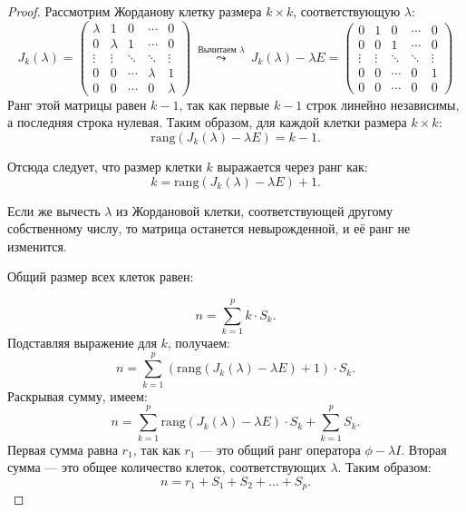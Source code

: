 \begin{proof}
    Рассмотрим Жорданову клетку размера \( k \times k \), соответствующую \( \lambda \):
    \[
    J_k(\lambda) = \begin{pmatrix}
    \lambda & 1 & 0 & \cdots & 0 \\
    0 & \lambda & 1 & \cdots & 0 \\
    \vdots & \vdots & \ddots & \ddots & \vdots \\
    0 & 0 & \cdots & \lambda & 1 \\
    0 & 0 & \cdots & 0 & \lambda
    \end{pmatrix}
    \ \overset{\text{Вычитаем } \lambda}{\leadsto} \ 
    J_k(\lambda) - \lambda E = \begin{pmatrix}
    0 & 1 & 0 & \cdots & 0 \\
    0 & 0 & 1 & \cdots & 0 \\
    \vdots & \vdots & \ddots & \ddots & \vdots \\
    0 & 0 & \cdots & 0 & 1 \\
    0 & 0 & \cdots & 0 & 0
    \end{pmatrix}
    \]
    Ранг этой матрицы равен \( k - 1 \), так как первые \( k - 1 \) строк линейно независимы, а последняя строка нулевая. Таким образом, для каждой клетки размера \( k \times k \):
    \[
    \text{rang}(J_k(\lambda) - \lambda E) = k - 1.
    \]
    
    Отсюда следует, что размер клетки \( k \) выражается через ранг как:
    \[
    k = \text{rang}(J_k(\lambda) - \lambda E) + 1.
    \]
    
    
    Если же вычесть \( \lambda \) из Жордановой клетки, соответствующей другому собственному числу, то матрица останется невырожденной, и её ранг не изменится.

    Общий размер всех клеток равен:
    
    \[
    n = \sum_{k=1}^p k \cdot S_k.
    \]
    Подставляя выражение для \( k \), получаем:
    \[
    n = \sum_{k=1}^p (\text{rang}(J_k(\lambda) - \lambda E) + 1) \cdot S_k.
    \]
    Раскрывая сумму, имеем:
    \[
    n = \sum_{k=1}^p \text{rang}(J_k(\lambda) - \lambda E) \cdot S_k + \sum_{k=1}^p S_k.
    \]
    Первая сумма равна \( r_1 \), так как \( r_1 \) — это общий ранг оператора \( \phi - \lambda I \). Вторая сумма — это общее количество клеток, соответствующих \( \lambda \). Таким образом:
    \[
    n = r_1 + S_1 + S_2 + \ldots + S_p.
    \]


\end{proof}
